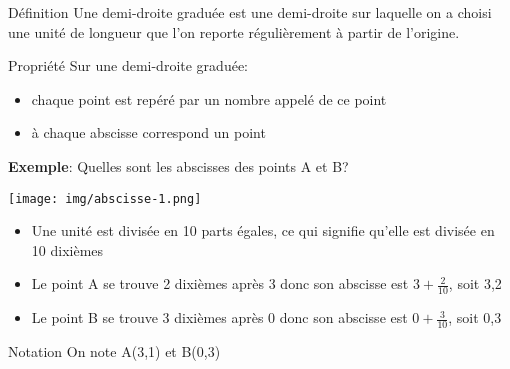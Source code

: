 \documentclass[12pt,a4paper]{article}
\begin{document}
\begin{definition}{Définition}
Une demi-droite graduée est une demi-droite sur laquelle on a choisi une unité de longueur que l'on reporte régulièrement à partir de l'origine.
\end{definition}

\begin{definition}{Propriété}
Sur une demi-droite graduée:
\begin{itemize}
\item chaque point est repéré par un nombre appelé  de ce point
\item à chaque abscisse correspond un point
\end{itemize}
\end{definition}

\textbf{Exemple}: Quelles sont les abscisses des points A et B?

\texttt{[image: img/abscisse-1.png]} 

\begin{itemize}
\item Une unité est divisée en 10 parts égales, ce qui signifie qu'elle est divisée en 10 dixièmes
\item Le point A se trouve 2 dixièmes après 3 donc son abscisse est $3+\frac{2}{10}$, soit 3,2
\item Le point B se trouve 3 dixièmes après 0 donc son abscisse est $0+\frac{3}{10}$, soit 0,3
\end{itemize}

\begin{definition}{Notation}
On note A(3,1) et B(0,3)
\end{definition}
\end{document}
